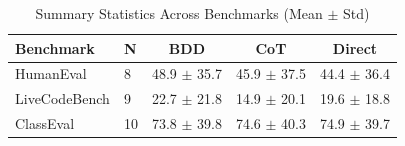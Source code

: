 \begin{table}[htbp]
\centering
\caption{Summary Statistics Across Benchmarks (Mean $\pm$ Std)}
\label{tab:summary_stats}
\begin{tabular}{llccc}
\toprule
Benchmark & N & BDD & CoT & Direct \\
\midrule
HumanEval & 8 & 48.9 $\pm$ 35.7 & 45.9 $\pm$ 37.5 & 44.4 $\pm$ 36.4 \\
LiveCodeBench & 9 & 22.7 $\pm$ 21.8 & 14.9 $\pm$ 20.1 & 19.6 $\pm$ 18.8 \\
ClassEval & 10 & 73.8 $\pm$ 39.8 & 74.6 $\pm$ 40.3 & 74.9 $\pm$ 39.7 \\
\bottomrule
\end{tabular}
\end{table}